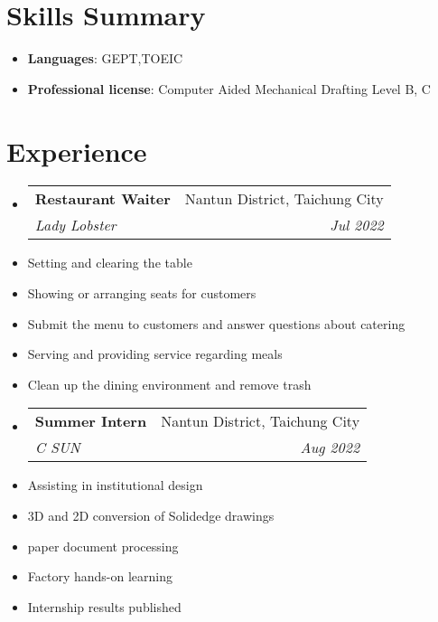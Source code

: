 \documentclass[letterpaper,10.8pt]{article}
\makeatletter
\newcommand{\resumeItem}[2]{
  \item\small{
    \textbf{#1}{: #2 \vspace{-2pt}}
  }
}
\newcommand{\resumeSubheading}[4]{
  \vspace{-1pt}\item
    \begin{tabular*}{0.97\textwidth}{l@{\extracolsep{\fill}}r}
      \textbf{#1} & #2 \\
      \textit{\small#3} & \textit{\small #4} \\
    \end{tabular*}\vspace{-5pt}
}
\newcommand{\resumeSubItem}[2]{\resumeItem{#1}{#2}\vspace{-4pt}}
\newcommand{\resumeSubHeadingListStart}{\begin{itemize}[leftmargin=*]}
\newcommand{\resumeSubHeadingListEnd}{\end{itemize}}
\makeatother
\begin{document}
    \section{Skills Summary}
	\resumeSubHeadingListStart
    \resumeSubItem{Languages}{GEPT,TOEIC}\resumeSubItem{Professional license}{Computer Aided Mechanical Drafting Level B, C}\resumeSubHeadingListEnd\section{Experience}
\begin{itemize}
 \resumeSubheading
    {Restaurant Waiter}{Nantun District, Taichung City}
    {Lady Lobster}{Jul 2022}
    \item {Setting and clearing the table}
    \item {Showing or arranging seats for customers}
    \item {Submit the menu to customers and answer questions about catering}
    \item {Serving and providing service regarding meals}
    \item {Clean up the dining environment and remove trash}
\end{itemize}
\begin{itemize}
    \resumeSubheading
    {Summer Intern}{Nantun District, Taichung City}
    {C SUN}{Aug 2022}
    \item {Assisting in institutional design}
    \item {3D and 2D conversion of Solidedge drawings}
    \item {paper document processing}
    \item {Factory hands-on learning}
    \item {Internship results published}
\end{itemize}

    
\end{document}
